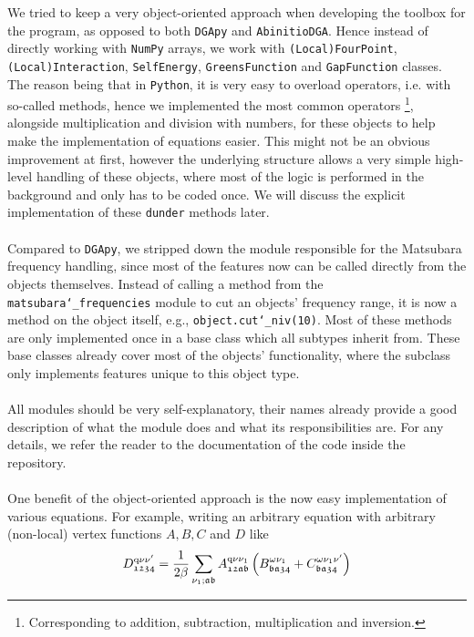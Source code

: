 \documentclass[\main/main.tex]{subfiles}
\begin{document}
We tried to keep a very object-oriented approach when developing the toolbox for the program, as opposed to both \texttt{DGApy} and \texttt{AbinitioDGA}. Hence instead of directly working with \texttt{NumPy} arrays, we work with \texttt{(Local)FourPoint}, \texttt{(Local)Interaction}, \texttt{SelfEnergy}, \texttt{GreensFunction} and \texttt{GapFunction} classes. The reason being that in \texttt{Python}, it is very easy to overload operators, i.e. with so-called  methods, hence we implemented the most common operators \footnote{Corresponding to addition, subtraction, multiplication and inversion.}, alongside multiplication and division with numbers, for these objects to help make the implementation of equations easier. This might not be an obvious improvement at first, however the underlying structure allows a very simple high-level handling of these objects, where most of the logic is performed in the background and only has to be coded once. We will discuss the explicit implementation of these \texttt{dunder} methods later.
\\\\
Compared to \texttt{DGApy}, we stripped down the module responsible for the Matsubara frequency handling, since most of the features now can be called directly from the objects themselves. Instead of calling a method from the \texttt{matsubara\char`_frequencies} module to cut an objects' frequency range, it is now a method on the object itself, e.g., \texttt{object.cut\char`_niv(10)}. Most of these methods are only implemented once in a base class which all subtypes inherit from. These base classes already cover most of the objects' functionality, where the subclass only implements features unique to this object type.
\\\\
All modules should be very self-explanatory, their names already provide a good description of what the module does and what its responsibilities are. For any details, we refer the reader to the documentation of the code inside the repository.
\\\\
One benefit of the object-oriented approach is the now easy implementation of various equations. For example, writing an arbitrary equation with arbitrary (non-local) vertex functions $A,B,C$ and $D$ like
\begin{align}
	D^{\text{q}\nu\nu'}_{\mathfrak{1234}}=\frac{1}{2\beta} \sum_{\nu_1;\mathfrak{ab}} A^{\text{q}\nu\nu_1}_{\mathfrak{12ab}}\left (B^{\omega\nu_1}_{\mathfrak{ba34}}+C^{\omega\nu_1\nu'}_{\mathfrak{ba34}}\right )
\end{align}
\end{document}
